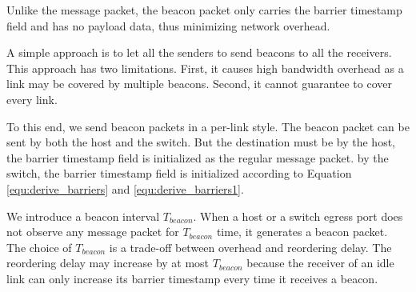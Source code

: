 Unlike the message packet, the beacon packet only carries the barrier timestamp field and has no payload data, thus minimizing network overhead. 

A simple approach is to let all the senders to send beacons to all the receivers.
This approach has two limitations.
First, it causes high bandwidth overhead as a link may be covered by multiple beacons.
Second, it cannot guarantee to cover every link.

To this end, we send beacon packets in a per-link style.
The beacon packet can be sent by both the host and the switch.
But the destination must be 
 by the host, the barrier timestamp field is initialized  as the regular message packet.
 by the switch, the barrier timestamp field is initialized according to Equation \ref{equ:derive_barriers} and \ref{equ:derive_barriers1}.

We introduce a beacon interval $T_{beacon}$.
When a host or a switch egress port does not observe any message packet for $T_{beacon}$ time, it generates a beacon packet.
The choice of $T_{beacon}$ is a trade-off between overhead and reordering delay. The reordering delay may increase by at most $T_{beacon}$ because the receiver of an idle link can only increase its barrier timestamp every time it receives a beacon.




